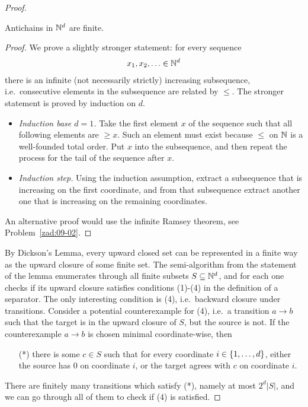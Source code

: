 \begin{proof}
\begin{claim}\label{clm:dickson}
	Antichains in $\mathbb{N}^d$ are finite.
\end{claim}
\begin{proof} We prove a slightly stronger statement: for every sequence 
\begin{align*}
  x_1,x_2,\ldots \in \mathbb{N}^d
\end{align*}
there is an infinite (not necessarily strictly) increasing  subsequence, i.e.~consecutive elements in the subsequence are related by $\le$. The stronger statement is proved by induction on $d$. 
\begin{itemize}
	\item \emph{Induction base $d=1$.} Take the first element $x$ of the sequence such that all following elements are $\ge x$.  Such an element must exist because $\le$ on  $\mathbb{N}$ is a well-founded total order. Put $x$ into the subsequence, and then repeat the process for the tail of the sequence after $x$.
	\item  \emph{Induction  step.} Using the induction assumption,  extract a subsequence that is increasing on the first coordinate, and from that subsequence extract another one that is increasing on the remaining coordinates.
\end{itemize}
An alternative proof would use the infinite Ramsey theorem, see Problem~\ref{zad:09-02}.
\end{proof}

By Dickson's Lemma, every upward closed set can be represented in a finite way as the upward closure of some finite set. The semi-algorithm from the statement of the lemma enumerates through all finite subsets $S \subseteq \mathbb{N}^d$, and for each one checks if its upward closure satisfies conditions (1)-(4) in the definition of a separator. The only interesting condition is (4), i.e.~backward closure under transitions. Consider a potential counterexample for (4), i.e.~a transition  $a \to b$ such that the target is in the upward closure of $S$, but the source is not. If the counterexample $a \to b$ is chosen minimal coordinate-wise, then 
\begin{itemize}
\item[(*)] there is some $c \in S$ such that for every coordinate $i \in \{1,\ldots,d\}$, either the source  has $0$ on coordinate $i$, or the target agrees with $c$ on coordinate $i$.
\end{itemize}
There are finitely many transitions which satisfy (*), namely at most $2^d|S|$, and we can go through all of them to check if (4) is satisfied.
\end{proof}
